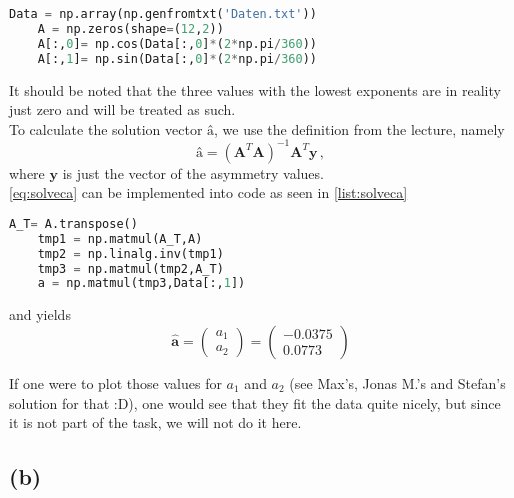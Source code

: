 \begin{lstlisting}[language = Python, caption={Calculation of design matrix \textbf{A}. The file \texttt{Daten.txt} holds the table data from the exercise sheet.}, label = {list:designmat}]
    Data = np.array(np.genfromtxt('Daten.txt'))
    A = np.zeros(shape=(12,2))
    A[:,0]= np.cos(Data[:,0]*(2*np.pi/360))
    A[:,1]= np.sin(Data[:,0]*(2*np.pi/360))
\end{lstlisting}

It should be noted that the three values with the lowest exponents are in reality just zero and will be treated as such. \\

To calculate the solution vector $\textbf{â}$, we use the definition from the lecture, namely
\begin{equation}
    \textbf{â} = (\textbf{A}^T\textbf{A})^{-1}\textbf{A}^T \textbf{y} \,,
    \label{eq:solveca}
\end{equation}
where $\textbf{y}$ is just the vector of the asymmetry values. \\

\eqref{eq:solveca} can be implemented into code as seen in \autoref{list:solveca}


\begin{lstlisting}[language = Python, caption={Calculation of solution vector \textbf{â}.}, label = {list:solveca}]
    A_T= A.transpose()
    tmp1 = np.matmul(A_T,A)
    tmp2 = np.linalg.inv(tmp1)
    tmp3 = np.matmul(tmp2,A_T)
    a = np.matmul(tmp3,Data[:,1])
\end{lstlisting}
and yields
\begin{equation*}
    \hat{\textbf{a}} = \left(\begin{array}{c}
        a_1 \\  
        a_2
    \end{array} \right) 
    = \left(\begin{array}{c}
        -0.0375 \\  
        0.0773
    \end{array} \right)
\end{equation*}

If one were to plot those values for $a_1$ and $a_2$ (see Max's, Jonas M.'s and Stefan's solution for that :D), one would see that they fit the data quite nicely, but since it is not part of the task, we will not
do it here.

\subsection*{(b)}

